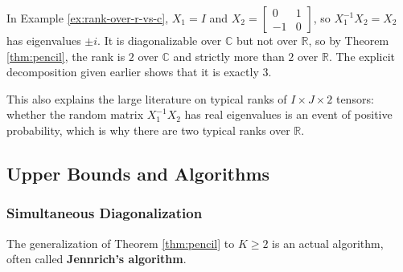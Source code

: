   \begin{example}
    In Example \ref{ex:rank-over-r-vs-c}, $X_1 = I$ and $X_2 = \begin{bmatrix} 0 & 1 \\ -1 & 0 \end{bmatrix}$, so $X_1^{-1}X_2 = X_2$ has eigenvalues $\pm i$. It is diagonalizable over $\mathbb{C}$ but not over $\mathbb{R}$, so by Theorem \ref{thm:pencil}, the rank is $2$ over $\mathbb{C}$ and strictly more than $2$ over $\mathbb{R}$. The explicit decomposition given earlier shows that it is exactly $3$.
  \end{example}

  This also explains the large literature on typical ranks of $I \times J \times 2$ tensors: whether the random matrix $X_1^{-1} X_2$ has real eigenvalues is an event of positive probability, which is why there are two typical ranks over $\mathbb{R}$.

\subsection{Upper Bounds and Algorithms}

  \subsubsection{Simultaneous Diagonalization}

    The generalization of Theorem \ref{thm:pencil} to $K \geq 2$ is an actual algorithm, often called \textbf{Jennrich's algorithm}. 

